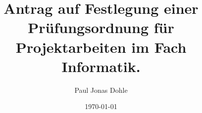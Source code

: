 \documentclass[a4paper,12pt]{article}
\title{Antrag auf Festlegung einer Prüfungsordnung für Projektarbeiten im Fach Informatik.}
\author{Paul Jonas Dohle}
\date{\today} %
\begin{document}
\maketitle

\pagebreak
\end{document}
